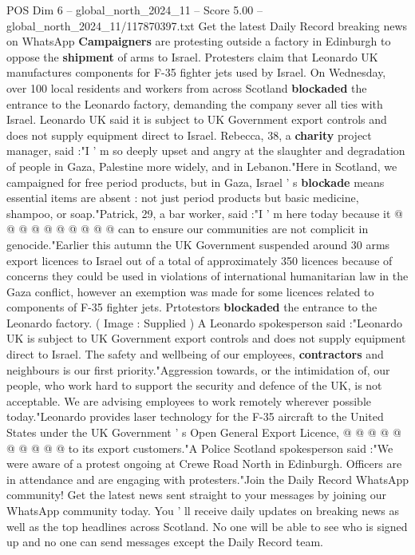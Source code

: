 \begin{textsample}{POS Dim 6 – global\_north\_2024\_11 – Score 5.00 – global\_north\_2024\_11/117870397.txt}  \label{ex:f6_pos_284}
Get the latest Daily Record breaking news on WhatsApp \textbf{Campaigners} are protesting outside a factory in Edinburgh to oppose the \textbf{shipment} of arms to Israel.
Protesters claim that Leonardo UK manufactures components for F-35 fighter jets used by Israel.
On Wednesday, over 100 local residents and workers from across Scotland \textbf{blockaded} the entrance to the Leonardo factory, demanding the company sever all ties with Israel.
Leonardo UK said it is subject to UK Government export controls and does not supply equipment direct to Israel.
Rebecca, 38, a \textbf{charity} project manager, said :"I ' m so deeply upset and angry at the slaughter and degradation of people in Gaza, Palestine more widely, and in Lebanon."Here in Scotland, we campaigned for free period products, but in Gaza, Israel ' s \textbf{blockade} means essential items are absent : not just period products but basic medicine, shampoo, or soap."Patrick, 29, a bar worker, said :"I ' m here today because it @ @ @ @ @ @ @ @ @ @ can to ensure our communities are not complicit in genocide."Earlier this autumn the UK Government suspended around 30 arms export licences to Israel out of a total of approximately 350 licences because of concerns they could be used in violations of international humanitarian law in the Gaza conflict, however an exemption was made for some licences related to components of F-35 fighter jets.
Prtotestors \textbf{blockaded} the entrance to the Leonardo factory. ( Image : Supplied ) A Leonardo spokesperson said :"Leonardo UK is subject to UK Government export controls and does not supply equipment direct to Israel.
The safety and wellbeing of our employees, \textbf{contractors} and neighbours is our first priority."Aggression towards, or the intimidation of, our people, who work hard to support the security and defence of the UK, is not acceptable.
We are advising employees to work remotely wherever possible today."Leonardo provides laser technology for the F-35 aircraft to the United States under the UK Government ' s Open General Export Licence, @ @ @ @ @ @ @ @ @ @ to its export customers."A Police Scotland spokesperson said :"We were aware of a protest ongoing at Crewe Road North in Edinburgh.
Officers are in attendance and are engaging with protesters."Join the Daily Record WhatsApp community!
Get the latest news sent straight to your messages by joining our WhatsApp community today.
You ' ll receive daily updates on breaking news as well as the top headlines across Scotland.
No one will be able to see who is signed up and no one can send messages except the Daily Record team.

\end{textsample}
